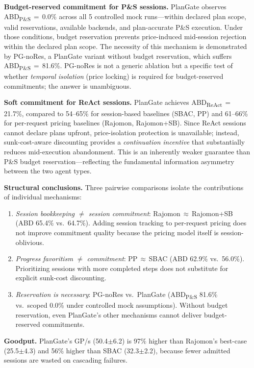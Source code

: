 \documentclass[sigconf,review,anonymous]{acmart}
\begin{document}
\textbf{Budget-reserved commitment for P\&S sessions.} PlanGate observes ABD\textsubscript{P\&S}$\,{=}\,$0.0\% across all 5 controlled mock runs---within declared plan scope, valid reservations, available backends, and plan-accurate P\&S execution. Under those conditions, budget reservation prevents price-induced mid-session rejection within the declared plan scope. The necessity of this mechanism is demonstrated by PG-noRes, a PlanGate variant without budget reservation, which suffers ABD\textsubscript{P\&S}$\,{=}\,$81.6\%. PG-noRes is not a generic ablation but a specific test of whether \emph{temporal isolation} (price locking) is required for budget-reserved commitments; the answer is unambiguous.

\textbf{Soft commitment for ReAct sessions.} PlanGate achieves ABD\textsubscript{ReAct}$\,{=}\,$21.7\%, compared to 54--65\% for session-based baselines (SBAC, PP) and 61--66\% for per-request pricing baselines (Rajomon, Rajomon+SB). Since ReAct sessions cannot declare plans upfront, price-isolation protection is unavailable; instead, sunk-cost-aware discounting provides a \emph{continuation incentive} that substantially reduces mid-execution abandonment. This is an inherently weaker guarantee than P\&S budget reservation---reflecting the fundamental information asymmetry between the two agent types.

\textbf{Structural conclusions.}
Three pairwise comparisons isolate the contributions of individual mechanisms:
\begin{enumerate}[nosep,leftmargin=*]
  \item \emph{Session bookkeeping $\neq$ session commitment}: Rajomon$\,{\approx}\,$Rajomon+SB (ABD 65.4\% vs.\ 64.7\%). Adding session tracking to per-request pricing does not improve commitment quality because the pricing model itself is session-oblivious.
  \item \emph{Progress favoritism $\neq$ commitment}: PP$\,{\approx}\,$SBAC (ABD 62.9\% vs.\ 56.0\%). Prioritizing sessions with more completed steps does not substitute for explicit sunk-cost discounting.
  \item \emph{Reservation is necessary}: PG-noRes vs.\ PlanGate (ABD\textsubscript{P\&S} 81.6\% vs.\ scoped 0.0\% under controlled mock assumptions). Without budget reservation, even PlanGate's other mechanisms cannot deliver budget-reserved commitments.
\end{enumerate}

\textbf{Goodput.} PlanGate's GP/s (50.4$\pm$6.2) is 97\% higher than Rajomon's best-case (25.5$\pm$4.3) and 56\% higher than SBAC (32.3$\pm$2.2), because fewer admitted sessions are wasted on cascading failures.
\end{document}
